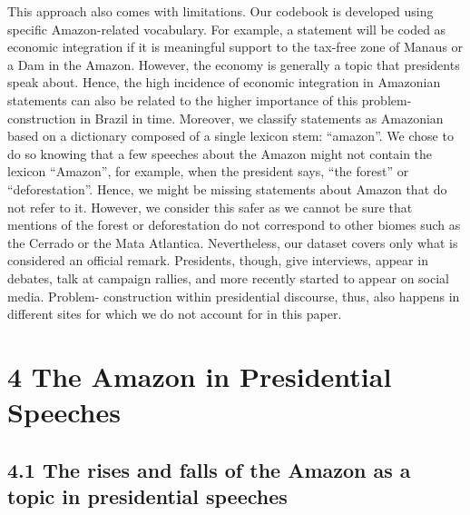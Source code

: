 \documentclass[
]{article}
\begin{document}
This approach also comes with limitations. Our codebook is developed
using specific Amazon-related vocabulary. For example, a statement will
be coded as economic integration if it is meaningful support to the
tax-free zone of Manaus or a Dam in the Amazon. However, the economy is
generally a topic that presidents speak about. Hence, the high incidence
of economic integration in Amazonian statements can also be related to
the higher importance of this problem-construction in Brazil in time.
Moreover, we classify statements as Amazonian based on a dictionary
composed of a single lexicon stem: ``amazon''. We chose to do so knowing
that a few speeches about the Amazon might not contain the lexicon
``Amazon'', for example, when the president says, ``the forest'' or
``deforestation''. Hence, we might be missing statements about Amazon
that do not refer to it. However, we consider this safer as we cannot be
sure that mentions of the forest or deforestation do not correspond to
other biomes such as the Cerrado or the Mata Atlantica. Nevertheless,
our dataset covers only what is considered an official remark.
Presidents, though, give interviews, appear in debates, talk at campaign
rallies, and more recently started to appear on social media. Problem-
construction within presidential discourse, thus, also happens in
different sites for which we do not account for in this paper.

\hypertarget{the-amazon-in-presidential-speeches}{%
\section{4 The Amazon in Presidential
Speeches}\label{the-amazon-in-presidential-speeches}}

\hypertarget{the-rises-and-falls-of-the-amazon-as-a-topic-in-presidential-speeches}{%
\subsection{4.1 The rises and falls of the Amazon as a topic in
presidential
speeches}\label{the-rises-and-falls-of-the-amazon-as-a-topic-in-presidential-speeches}}
\end{document}
